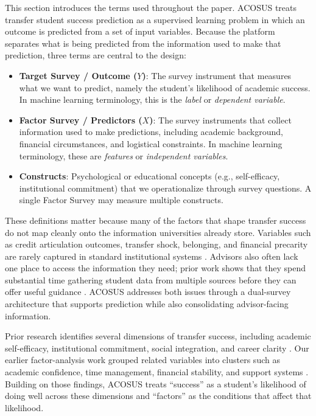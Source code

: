 \documentclass[letterpaper,11pt]{article}
\begin{document}
This section introduces the terms used throughout the paper. ACOSUS treats transfer student success prediction as a supervised learning problem in which an outcome is predicted from a set of input variables. Because the platform separates what is being predicted from the information used to make that prediction, three terms are central to the design:

\begin{itemize}
    \item \textbf{Target Survey / Outcome ($Y$)}: The survey instrument that measures what we want to predict, namely the student's likelihood of academic success. In machine learning terminology, this is the \emph{label} or \emph{dependent variable}.
    \item \textbf{Factor Survey / Predictors ($X$)}: The survey instruments that collect information used to make predictions, including academic background, financial circumstances, and logistical constraints. In machine learning terminology, these are \emph{features} or \emph{independent variables}.
    \item \textbf{Constructs}: Psychological or educational concepts (e.g., self-efficacy, institutional commitment) that we operationalize through survey questions. A single Factor Survey may measure multiple constructs.
\end{itemize}

These definitions matter because many of the factors that shape transfer success do not map cleanly onto the information universities already store. Variables such as credit articulation outcomes, transfer shock, belonging, and financial precarity are rarely captured in standard institutional systems \parencite{nguyen2025school}. Advisors also often lack one place to access the information they need; prior work shows that they spend substantial time gathering student data from multiple sources before they can offer useful guidance \parencite{preposttransfer2014}. ACOSUS addresses both issues through a dual-survey architecture that supports prediction while also consolidating advisor-facing information.

Prior research identifies several dimensions of transfer success, including academic self-efficacy, institutional commitment, social integration, and career clarity \parencite{factoranalysis2023}. Our earlier factor-analysis work grouped related variables into clusters such as academic confidence, time management, financial stability, and support systems \parencite{factoranalysis2023}. Building on those findings, ACOSUS treats ``success'' as a student's likelihood of doing well across these dimensions and ``factors'' as the conditions that affect that likelihood.
\end{document}
